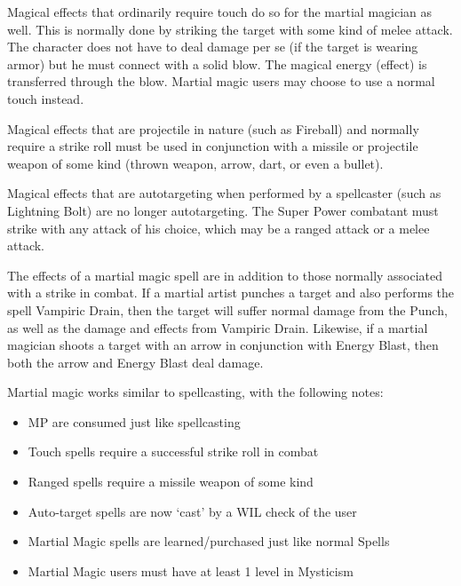 \documentclass[twoside]{book}
\begin{document}
    {  
     Magical effects that ordinarily require touch do so
               for the martial magician as well. This is normally done by
               striking the target with some kind of melee attack. The
               character does not have to deal damage per se (if the
               target is wearing armor) but he must connect with a solid
               blow. The magical energy (effect) is transferred through
               the blow. Martial magic users may choose to use a normal
               touch instead. 
    }
  
    {  
     Magical effects that are projectile in nature (such
               as Fireball) and normally require a strike roll must be
               used in conjunction with a missile or projectile weapon of
               some kind (thrown weapon, arrow, dart, or even a bullet).
               
    }
  
    {  
     Magical effects that are autotargeting when
               performed by a spellcaster (such as Lightning Bolt) are no
               longer autotargeting. The Super Power combatant must
               strike with any attack of his choice, which may be a
               ranged attack or a melee attack. 
    }
  
    {  
     The effects of a martial magic spell are in
               addition to those normally associated with a strike in
               combat. If a martial artist punches a target and also
               performs the spell Vampiric Drain, then the target will
               suffer normal damage from the Punch, as well as the damage
               and effects from Vampiric Drain. Likewise, if a martial
               magician shoots a target with an arrow in conjunction with
               Energy Blast, then both the arrow and Energy Blast deal
               damage. 
    }
  
    {  
     Martial magic works similar to spellcasting, with
               the following notes: 
    }
  
\begin{itemize}
      
  \item   MP are consumed just like spellcasting 
  \item   Touch spells require a successful strike roll in
                 combat 
  \item   Ranged spells require a missile weapon of some
                 kind 
  \item   Auto-target spells are now `cast' by
                 a WIL check of the user 
  \item   Martial Magic spells are learned/purchased just
                 like normal Spells 
  \item   Martial Magic users must have at least 1 level in
                 Mysticism 
\end{itemize}
  
\end{document}
